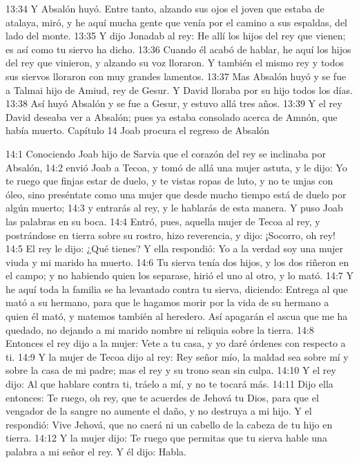 13:34 Y Absalón huyó. Entre tanto, alzando sus ojos el joven que estaba de atalaya, miró, y he aquí mucha gente que venía por el camino a sus espaldas, del lado del monte.  
13:35 Y dijo Jonadab al rey: He allí los hijos del rey que vienen; es así como tu siervo ha dicho.  
13:36 Cuando él acabó de hablar, he aquí los hijos del rey que vinieron, y alzando su voz lloraron. Y también el mismo rey y todos sus siervos lloraron con muy grandes lamentos.  
13:37 Mas Absalón huyó y se fue a Talmai hijo de Amiud, rey de Gesur. Y David lloraba por su hijo todos los días.  
13:38 Así huyó Absalón y se fue a Gesur, y estuvo allá tres años.  
13:39 Y el rey David deseaba ver a Absalón; pues ya estaba consolado acerca de Amnón, que había muerto.  
Capítulo 14 
Joab procura el regreso de Absalón  

14:1 Conociendo Joab hijo de Sarvia que el corazón del rey se inclinaba por Absalón,  
14:2 envió Joab a Tecoa, y tomó de allá una mujer astuta, y le dijo: Yo te ruego que finjas estar de duelo, y te vistas ropas de luto, y no te unjas con óleo, sino preséntate como una mujer que desde mucho tiempo está de duelo por algún muerto;  
14:3 y entrarás al rey, y le hablarás de esta manera. Y puso Joab las palabras en su boca.  
14:4 Entró, pues, aquella mujer de Tecoa al rey, y postrándose en tierra sobre su rostro, hizo reverencia, y dijo: ¡Socorro, oh rey!  
14:5 El rey le dijo: ¿Qué tienes? Y ella respondió: Yo a la verdad soy una mujer viuda y mi marido ha muerto.  
14:6 Tu sierva tenía dos hijos, y los dos riñeron en el campo; y no habiendo quien los separase, hirió el uno al otro, y lo mató. 
14:7 Y he aquí toda la familia se ha levantado contra tu sierva, diciendo: Entrega al que mató a su hermano, para que le hagamos morir por la vida de su hermano a quien él mató, y matemos también al heredero. Así apagarán el ascua que me ha quedado, no dejando a mi marido nombre ni reliquia sobre la tierra.  
14:8 Entonces el rey dijo a la mujer: Vete a tu casa, y yo daré órdenes con respecto a ti.  
14:9 Y la mujer de Tecoa dijo al rey: Rey señor mío, la maldad sea sobre mí y sobre la casa de mi padre; mas el rey y su trono sean sin culpa.  
14:10 Y el rey dijo: Al que hablare contra ti, tráelo a mí, y no te tocará más.  
14:11 Dijo ella entonces: Te ruego, oh rey, que te acuerdes de Jehová tu Dios, para que el vengador de la sangre no aumente el daño, y no destruya a mi hijo. Y el respondió: Vive Jehová, que no caerá ni un cabello de la cabeza de tu hijo en tierra.  
14:12 Y la mujer dijo: Te ruego que permitas que tu sierva hable una palabra a mi señor el rey. Y él dijo: Habla.  
